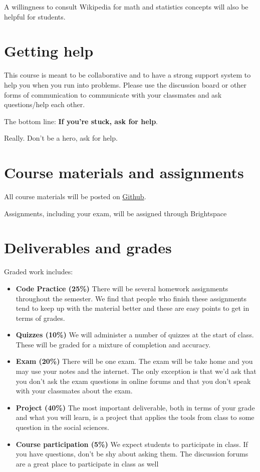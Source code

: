 \documentclass[12pt,pdftex,twoside,letterpaper]{exam}
\begin{document}
    A willingness to consult Wikipedia for math and statistics concepts will also be helpful for
    students.

  \section*{Getting help}

    This course is meant to be collaborative and to have a strong support system to help you when
    you run into problems. Please use the discussion board or other forms of communication to
    communicate with your classmates and ask questions/help each other.

    The bottom line:  {\bf If you're stuck, ask for help\/}.

    Really.  Don't be a hero, ask for help.

  \section*{Course materials and assignments}

    All course materials will be posted on \href{https://github.com/NYU-ComputationalSocialScience/ECON-GA-4004-S2023}{Github}.

    Assignments, including your exam, will be assigned through Brightspace

  \section*{Deliverables and grades}

    Graded work includes:

    \begin{itemize}
      \item {\bf Code Practice (25\%)} There will be several homework assignments throughout the
            semester. We find that people who finish these assignments tend to keep up
            with the material better and these are easy points to get in terms of grades.
      \item {\bf Quizzes (10\%)} We will administer a number of quizzes at the start of class. These
            will be graded for a mixture of completion and accuracy.
      \item {\bf Exam (20\%)} There will be one exam. The exam will be take home and you may use
            your notes and the internet. The only exception is that we'd ask that you don't ask
            the exam questions in online forums and that you don't speak with your classmates about
            the exam.
      \item {\bf Project (40\%)} The most important deliverable, both in terms of your grade and
            what you will learn, is a project that applies the tools from class to some question
            in the social sciences.
      \item {\bf Course participation (5\%)} We expect students to participate in class. If you have
            questions, don't be shy about asking them. The discussion forums are a great place to
            participate in class as well
    \end{itemize}
\end{document}

